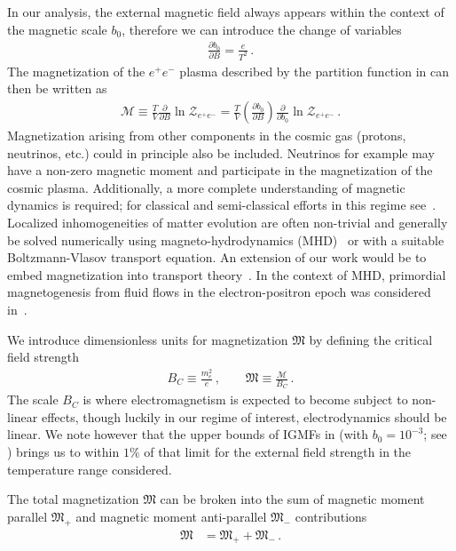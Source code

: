 In our analysis, the external magnetic field always appears within the context of the magnetic scale $b_{0}$, therefore we can introduce the change of variables
\begin{align}
 \frac{\partial b_{0}}{\partial{B}}=\frac{e}{T^{2}}\,.
\end{align}
The magnetization of the $e^{+}e^{-}$ plasma described by the partition function in  can then be written as
\begin{align}
 \label{defmagetization}
 \mathcal{M}\equiv\frac{T}{V}\frac{\partial}{\partial{B}}\ln{\mathcal{Z}_{e^{+}e^{-}}} = \frac{T}{V}\left(\frac{\partial b_{0}}{\partial{B}}\right)\frac{\partial}{\partial b_{0}}\ln{\mathcal{Z}_{e^{+}e^{-}}}\,.
\end{align}
Magnetization arising from other components in the cosmic gas (protons, neutrinos, etc.) could in principle also be included. Neutrinos for example may have a non-zero magnetic moment and participate in the magnetization of the cosmic plasma. Additionally, a more complete understanding of magnetic dynamics is required; for classical and semi-classical efforts in this regime see~\cite{Rafelski:2017hce,Formanek:2019cga,Formanek:2021mcp}. Localized inhomogeneities of matter evolution are often non-trivial and generally be solved numerically using magneto-hydrodynamics (MHD)~\cite{melrose2008quantum,Vazza:2017qge,Vachaspati:2020blt} or with a suitable Boltzmann-Vlasov transport equation. An extension of our work would be to embed magnetization into transport theory~\cite{Formanek:2021blc}. In the context of MHD, primordial magnetogenesis from fluid flows in the electron-positron epoch was considered in~\cite{Gopal:2004ut,Perrone:2021srr}.

We introduce dimensionless units for magnetization ${\mathfrak M}$ by defining the critical field strength
\begin{align}
 {B}_{C}\equiv\frac{m_{e}^{2}}{e}\,,\qquad{\mathfrak M}\equiv\frac{\mathcal{M}}{{B}_{C}}\,.
\end{align}
The scale ${B}_{C}$ is where electromagnetism is expected to become subject to non-linear effects, though luckily in our regime of interest, electrodynamics should be linear. We note however that the upper bounds of IGMFs in  (with $b_{0}=10^{-3}$; see ) brings us to within $1\%$ of that limit for the external field strength in the temperature range considered.

The total magnetization ${\mathfrak M}$ can be broken into the sum of magnetic moment parallel ${\mathfrak M}_{+}$ and magnetic moment anti-parallel ${\mathfrak M}_{-}$ contributions
\begin{align}
\label{g2mag}
{\mathfrak M}&={\mathfrak M}_{+}+{\mathfrak M}_{-}\,.
\end{align}

